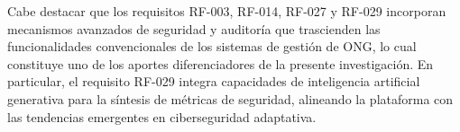 Cabe destacar que los requisitos RF-003, RF-014, RF-027 y RF-029 incorporan
mecanismos avanzados de seguridad y auditor\'ia que trascienden las
funcionalidades convencionales de los sistemas de gesti\'on de ONG, lo cual
constituye uno de los aportes diferenciadores de la presente investigaci\'on.
En particular, el requisito RF-029 integra capacidades de inteligencia artificial
generativa para la s\'intesis de m\'etricas de seguridad, alineando la plataforma
con las tendencias emergentes en ciberseguridad adaptativa.

